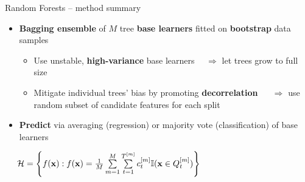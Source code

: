 \begin{frame}{Random Forests -- method summary}

 
  

\medskip

\begin{itemize}
  \item \textbf{Bagging ensemble} of $M$ tree \textbf{base learners} fitted on \textbf{bootstrap} data samples
   \begin{itemize}
    \item Use unstable, \textbf{high-variance} base learners ~~$\Rightarrow$
    let trees grow to full size
    \item Mitigate individual trees' bias by promoting \textbf{decorrelation} 
    ~~ $\Rightarrow$ use random subset of 
    candidate features for each split
  \end{itemize}
  \item \textbf{Predict} via averaging (regression) or majority vote 
  (classification) of base learners
\end{itemize}

\medskip

 ~~
$\mathcal{H} = \left\{ f(\mathbf{x}): f(\mathbf{x}) = \frac{1}{M} \sum\limits_{m = 1}^M 
\sum\limits_{t = 1}^{T^{[m]}} 
c_t^{[m]} \mathbb{I}(\mathbf{x} \in Q_t^{[m]}) \right\}$

\medskip


\end{frame}

